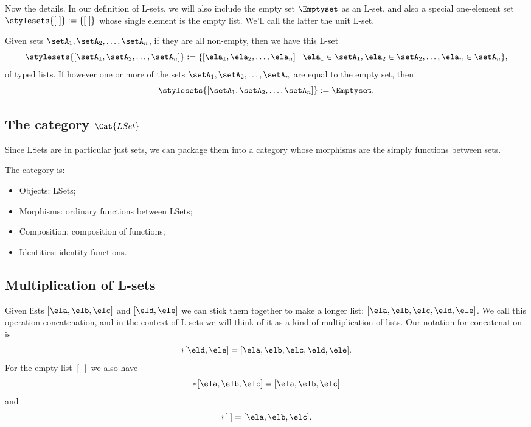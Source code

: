 Now the details.
In our definition of L-sets, we will also include the empty set $\Emptyset$ as an L-set, and also a special one-element set $\stylesets{[ \ ]} := \{ [ \ ] \}$ whose single element is the empty list.
We'll call the latter the unit L-set.

Given sets $\setA_1, \setA_2, \dots , \setA_n$, if they are all non-empty, then we have this L-set
\begin{equation}
    \stylesets{[\setA_1, \setA_2, \dots, \setA_n]} := \{ [ \ela_1, \ela_2, \dots, \ela_n] \mid \ela_1 \in \setA_1, \ela_2 \in \setA_2, \dots, \ela_n \in \setA_n \},
\end{equation}
of typed lists.
If however one or more of the sets $\setA_1, \setA_2, \dots , \setA_n$ are equal to the empty set, then \begin{equation}
    \stylesets{[\setA_1, \setA_2, \dots, \setA_n]} := \Emptyset.
\end{equation}

\subsection{The category $\Cat{LSet}$}

Since LSets are in particular just sets, we can package them into a category whose morphisms are the simply functions between sets.

\begin{ctdefinition}
    The category  is:

    \begin{itemize}
        \item Objects: LSets;
        \item Morphisms: ordinary functions between LSets;
        \item Composition: composition of functions;
        \item Identities: identity functions.
    \end{itemize}

\end{ctdefinition}

\subsection{Multiplication of L-sets}

Given lists $[\ela, \elb, \elc]$ and $[\eld, \ele]$ we can stick them together to make a longer list: $[\ela, \elb, \elc, \eld, \ele]$.
We call this operation concatenation, and in the context of L-sets we will think of it as a kind of multiplication of lists.
Our notation for concatenation is
\begin{equation}
    [\ela, \elb, \elc] * [\eld, \ele] = [\ela, \elb, \elc, \eld, \ele].
\end{equation}
For the empty list $[ \ ]$ we also have
\begin{equation}
    [ \ ] * [\ela, \elb, \elc]  = [\ela, \elb, \elc]
\end{equation}
and
\begin{equation}
    [\ela, \elb, \elc]  * [ \ ] = [\ela, \elb, \elc].
\end{equation}

